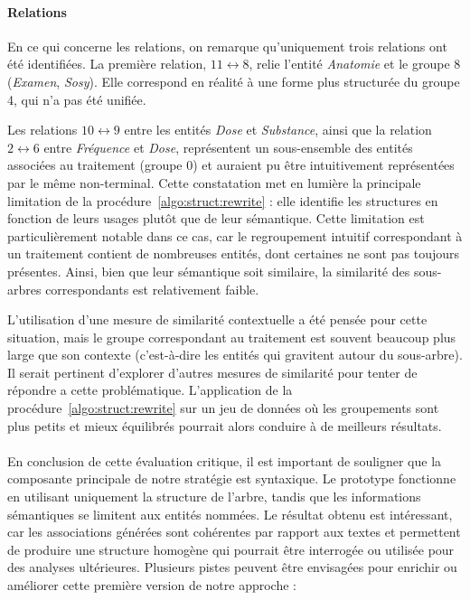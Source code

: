 \paragraph{Relations}
En ce qui concerne les relations, on remarque qu'uniquement trois relations ont été identifiées.
La première relation, $11 \leftrightarrow 8$, relie l'entité \emph{Anatomie} et le groupe 8 (\emph{Examen}, \emph{Sosy}).
Elle correspond en réalité à une forme plus structurée du groupe 4, qui n'a pas été unifiée.

Les relations $10 \leftrightarrow 9$ entre les entités \emph{Dose} et \emph{Substance}, ainsi que la relation $2 \leftrightarrow 6$ entre \emph{Fréquence} et \emph{Dose}, représentent un sous-ensemble des entités associées au traitement (groupe 0) et auraient pu être intuitivement représentées par le même non-terminal.
Cette constatation met en lumière la principale limitation de la procédure~\ref{algo:struct:rewrite} : elle identifie les structures en fonction de leurs usages plutôt que de leur sémantique.
Cette limitation est particulièrement notable dans ce cas, car le regroupement intuitif correspondant à un traitement contient de nombreuses entités, dont certaines ne sont pas toujours présentes.
Ainsi, bien que leur sémantique soit similaire, la similarité des sous-arbres correspondants est relativement faible.

L'utilisation d'une mesure de similarité contextuelle a été pensée pour cette situation, mais le groupe correspondant au traitement est souvent beaucoup plus large que son contexte (c'est-à-dire les entités qui gravitent autour du sous-arbre).
Il serait pertinent d'explorer d'autres mesures de similarité pour tenter de répondre a cette problématique.
L'application de la procédure~\ref{algo:struct:rewrite} sur un jeu de données où les groupements sont plus petits et mieux équilibrés pourrait alors conduire à de meilleurs résultats.

\paragraph{}
En conclusion de cette évaluation critique, il est important de souligner que la composante principale de notre stratégie est syntaxique.
Le prototype fonctionne en utilisant uniquement la structure de l'arbre, tandis que les informations sémantiques se limitent aux entités nommées.
Le résultat obtenu est intéressant, car les associations générées sont cohérentes par rapport aux textes et permettent de produire une structure homogène qui pourrait être interrogée ou utilisée pour des analyses ultérieures.
Plusieurs pistes peuvent être envisagées pour enrichir ou améliorer cette première version de notre approche :

